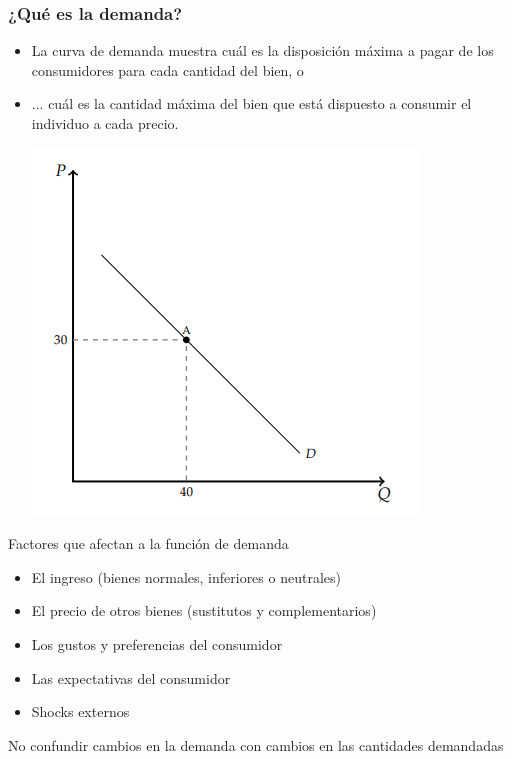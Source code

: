 \documentclass{beamer}
\begin{document}
  
\begin{frame}
  \frametitle{¿Qué es la demanda?}
  \begin{itemize}
    \item La curva de demanda muestra cuál es la disposición máxima a pagar de los consumidores para cada cantidad del bien, o \vspace{2mm}
    \item ... cuál es la cantidad máxima del bien que está dispuesto a consumir el individuo a cada precio.
    
    \centering
    \includegraphics[scale=0.7]{../Figures/C10.4.png}
  \end{itemize}
\end{frame}

\begin{frame}{Factores que afectan a la función de demanda}
  \begin{itemize}
    \item El ingreso (bienes normales, inferiores o neutrales)
    \item El precio de otros bienes (sustitutos y complementarios)
    \item Los gustos y preferencias del consumidor
    \item Las expectativas del consumidor
    \item Shocks externos
  \end{itemize}
  \begin{boxA}
    \begin{center}
      No confundir cambios en la demanda con cambios en las cantidades demandadas
    \end{center}
  \end{boxA}
\end{frame}
\end{document}
